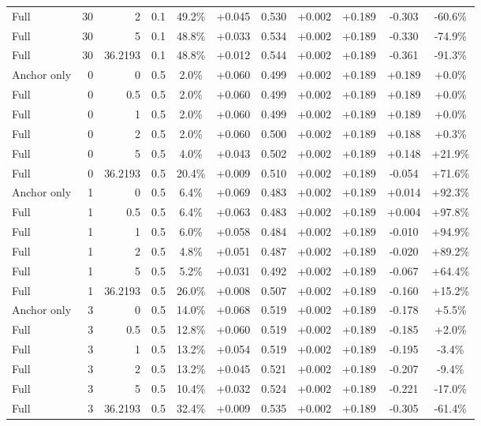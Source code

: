 \begin{table}[htbp]
\begin{tabular}{lrrrccccccc}
Full & 30 & 2 & 0.1 & 49.2\% & +0.045 & 0.530 & +0.002 & +0.189 & -0.303 & -60.6\% \\
Full & 30 & 5 & 0.1 & 48.8\% & +0.033 & 0.534 & +0.002 & +0.189 & -0.330 & -74.9\% \\
Full & 30 & 36.2193 & 0.1 & 48.8\% & +0.012 & 0.544 & +0.002 & +0.189 & -0.361 & -91.3\% \\
Anchor only & 0 & 0 & 0.5 & 2.0\% & +0.060 & 0.499 & +0.002 & +0.189 & +0.189 & +0.0\% \\
Full & 0 & 0.5 & 0.5 & 2.0\% & +0.060 & 0.499 & +0.002 & +0.189 & +0.189 & +0.0\% \\
Full & 0 & 1 & 0.5 & 2.0\% & +0.060 & 0.499 & +0.002 & +0.189 & +0.189 & +0.0\% \\
Full & 0 & 2 & 0.5 & 2.0\% & +0.060 & 0.500 & +0.002 & +0.189 & +0.188 & +0.3\% \\
Full & 0 & 5 & 0.5 & 4.0\% & +0.043 & 0.502 & +0.002 & +0.189 & +0.148 & +21.9\% \\
Full & 0 & 36.2193 & 0.5 & 20.4\% & +0.009 & 0.510 & +0.002 & +0.189 & -0.054 & +71.6\% \\
Anchor only & 1 & 0 & 0.5 & 6.4\% & +0.069 & 0.483 & +0.002 & +0.189 & +0.014 & +92.3\% \\
Full & 1 & 0.5 & 0.5 & 6.4\% & +0.063 & 0.483 & +0.002 & +0.189 & +0.004 & +97.8\% \\
Full & 1 & 1 & 0.5 & 6.0\% & +0.058 & 0.484 & +0.002 & +0.189 & -0.010 & +94.9\% \\
Full & 1 & 2 & 0.5 & 4.8\% & +0.051 & 0.487 & +0.002 & +0.189 & -0.020 & +89.2\% \\
Full & 1 & 5 & 0.5 & 5.2\% & +0.031 & 0.492 & +0.002 & +0.189 & -0.067 & +64.4\% \\
Full & 1 & 36.2193 & 0.5 & 26.0\% & +0.008 & 0.507 & +0.002 & +0.189 & -0.160 & +15.2\% \\
Anchor only & 3 & 0 & 0.5 & 14.0\% & +0.068 & 0.519 & +0.002 & +0.189 & -0.178 & +5.5\% \\
Full & 3 & 0.5 & 0.5 & 12.8\% & +0.060 & 0.519 & +0.002 & +0.189 & -0.185 & +2.0\% \\
Full & 3 & 1 & 0.5 & 13.2\% & +0.054 & 0.519 & +0.002 & +0.189 & -0.195 & -3.4\% \\
Full & 3 & 2 & 0.5 & 13.2\% & +0.045 & 0.521 & +0.002 & +0.189 & -0.207 & -9.4\% \\
Full & 3 & 5 & 0.5 & 10.4\% & +0.032 & 0.524 & +0.002 & +0.189 & -0.221 & -17.0\% \\
Full & 3 & 36.2193 & 0.5 & 32.4\% & +0.009 & 0.535 & +0.002 & +0.189 & -0.305 & -61.4\% \\

\end{tabular}
\end{table}
